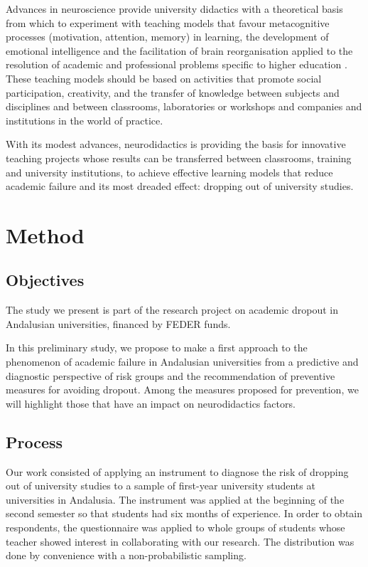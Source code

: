 \documentclass[english]{textolivre}
\begin{document}
Advances in neuroscience provide university didactics with a theoretical basis from which to experiment with teaching models that favour metacognitive processes (motivation, attention, memory) in learning, the development of emotional intelligence and the facilitation of brain reorganisation applied to the resolution of academic and professional problems specific to higher education \cite{marina_neurociencia_2012}. These teaching models should be based on activities that promote social participation, creativity, and the transfer of knowledge between subjects and disciplines and between classrooms, laboratories or workshops and companies and institutions in the world of practice.

With its modest advances, neurodidactics is providing the basis for innovative teaching projects \cite{hnoievska_formation_2021} whose results can be transferred between classrooms, training and university institutions, to achieve effective learning models that reduce academic failure and its most dreaded effect: dropping out of university studies.


\section{Method}\label{sec-fmt-manuscrito}
\subsection{Objectives}
The study we present is part of the research project on academic dropout in Andalusian universities, financed by FEDER funds.

In this preliminary study, we propose to make a first approach to the phenomenon of academic failure in Andalusian universities from a predictive and diagnostic perspective of risk groups and the recommendation of preventive measures for avoiding dropout. Among the measures proposed for prevention, we will highlight those that have an impact on neurodidactics factors.

\subsection{Process}\label{sec-formato}
Our work consisted of applying an instrument to diagnose the risk of dropping out of university studies to a sample of first-year university students at universities in Andalusia. The instrument was applied at the beginning of the second semester so that students had six months of experience. In order to obtain respondents, the questionnaire was applied to whole groups of students whose teacher showed interest in collaborating with our research. The distribution was done by convenience with a non-probabilistic sampling. 
\end{document}
